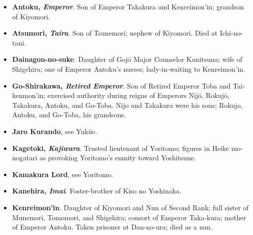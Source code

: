 \documentclass{article}
\begin{document}



\vspace*{-0.4cm}
\begin{small}

    \begin{itemize}[
            label=,
            leftmargin=0em,
            itemindent=-2em,
            nosep,
        ]

        \item \textbf{Antoku, \textit{Emperor}}. Son of Emperor Takakura and Kenreimon’in; grandson of Kiyomori.

        \item \textbf{Atsumori, \textit{Taira}}. Son of Tsunemori; nephew of Kiyomori. Died at Ichi-no-tani.

        \item \textbf{Dainagon-no-suke}. Daughter of Gojō Major Counselor Kunitsuna; wife of Shigehira; one of Emperor Antoku’s nurses; lady-in-waiting to Kenreimon’in.

        \item \textbf{Go-Shirakawa, \textit{Retired Emperor}}. Son of Retired Emperor Toba and Tai-kenmon’in; exercised authority during reigns of Emperors Nijō, Rokujō, Takakura, Antoku, and Go-Toba. Nijo and Takakura were his sons; Rokujo, Antoku, and Go-Toba, his grandsons.

        \item \textbf{Jaro Kurando}, see Yukiie.

        \item \textbf{Kagetoki, \textit{Kajiwara}}. Trusted lieutenant of Yoritomo; figures in Heike mo-nogatari as provoking Yoritomo’s enmity toward Yoshitsune.

        \item \textbf{Kamakura Lord}, see Yoritomo.

        \item \textbf{Kanehira, \textit{Imai}}. Foster-brother of Kiso no Yoshinaka.

        \item \textbf{Kenreimon'in}. Daughter of Kiyomori and Nun of Second Rank; full sister of Munemori, Tomomori, and Shigehira; consort of Emperor Taka-kura; mother of Emperor Antoku. Taken prisoner at Dan-no-ura; died as a nun.


\end{itemize}
\end{small}
\end{document}
